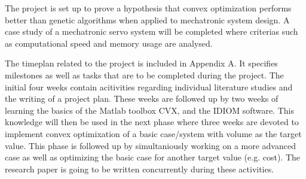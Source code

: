 The project is set up to prove a hypothesis that convex optimization performs better than genetic algorithms when applied to mechatronic system design. A case study of a mechatronic servo system will be completed where criterias such as computational speed and memory usage are analysed.  

The timeplan related to the project is included in Appendix A. It specifies milestones as well as tasks that are to be completed during the project. The initial four weeks contain acitivities regarding individual literature studies and the writing of a project plan. These weeks are followed up by two weeks of learning the basics of the Matlab toolbox CVX, and the IDIOM software. This knowledge will then be used in the next phase where three weeks are devoted to implement convex optimixation of a basic case/system with volume as the target value. This phase is followed up by simultaniously working on a more advanced case as well as optimizing the basic case for another target value (e.g. cost). The research paper is going to be written concurrently during these activities. 
